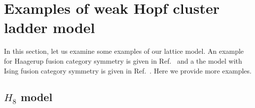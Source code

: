 \documentclass[a4paper,11pt]{article}
\theoremstyle{theorem}
\theoremstyle{remark}
\newcommand\eS         {\EuScript{S}}
\newcommand{\Vect}{\mathsf{Vect}}
\begin{document}












\section{Examples of weak Hopf cluster ladder model}
\label{sec:exampleCluster}
In this section, let us examine some examples of our lattice model.
An example for Haagerup fusion category symmetry is given in Ref.~\cite{jia2024quantumclusterstatemodel} and a the model with Ising fusion category symmetry is given in Ref.~\cite{jia2025Ising}. Here we provide more examples.

\subsection{$H_8$ model}
\end{document}
